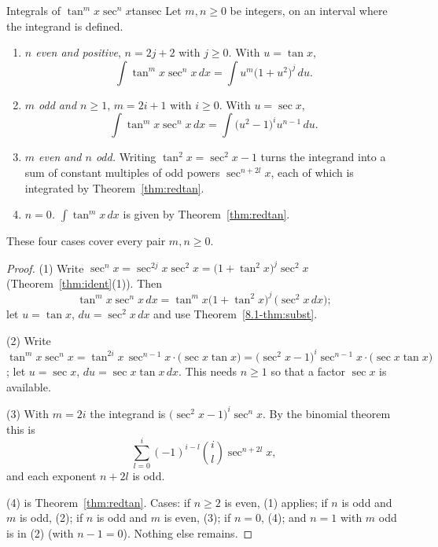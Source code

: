 \documentclass[11pt]{article}
\begin{document}
\begin{thm}{Integrals of $\tan^mx\sec^nx$}{tansec}
Let $m,n\ge0$ be integers, on an interval where the integrand is defined.
\begin{enumerate}[label=(\arabic*)]
  \item \emph{$n$ even and positive}, $n=2j+2$ with $j\ge0$. With $u=\tan x$,
  \[\int\tan^mx\sec^nx\,dx=\int u^m\big(1+u^2\big)^j\,du .\]
  \item \emph{$m$ odd and $n\ge1$}, $m=2i+1$ with $i\ge0$. With $u=\sec x$,
  \[\int\tan^mx\sec^nx\,dx=\int\big(u^2-1\big)^iu^{n-1}\,du .\]
  \item \emph{$m$ even and $n$ odd.} Writing $\tan^2x=\sec^2x-1$ turns the integrand into a sum of constant multiples of odd powers $\sec^{n+2l}x$, each of which is integrated by Theorem~\ref{thm:redtan}.
  \item \emph{$n=0$.} $\int\tan^mx\,dx$ is given by Theorem~\ref{thm:redtan}.
\end{enumerate}
These four cases cover every pair $m,n\ge0$.
\end{thm}
\begin{proof}
(1) Write $\sec^nx=\sec^{2j}x\sec^2x=\big(1+\tan^2x\big)^j\sec^2x$ (Theorem~\ref{thm:ident}(1)). Then
\[\tan^mx\sec^nx\,dx=\tan^mx\big(1+\tan^2x\big)^j\,\big(\sec^2x\,dx\big);\]
let $u=\tan x$, $du=\sec^2x\,dx$ and use Theorem~\ref{8.1-thm:subst}.

(2) Write $\tan^mx\sec^nx=\tan^{2i}x\,\sec^{n-1}x\cdot\big(\sec x\tan x\big)=\big(\sec^2x-1\big)^i\sec^{n-1}x\cdot\big(\sec x\tan x\big)$; let $u=\sec x$, $du=\sec x\tan x\,dx$. This needs $n\ge1$ so that a factor $\sec x$ is available.

(3) With $m=2i$ the integrand is $\big(\sec^2x-1\big)^i\sec^nx$. By the binomial theorem this is
\[\sum_{l=0}^i(-1)^{i-l}\binom il\sec^{n+2l}x,\]
and each exponent $n+2l$ is odd.

(4) is Theorem~\ref{thm:redtan}. Cases: if $n\ge2$ is even, (1) applies; if $n$ is odd and $m$ is odd, (2); if $n$ is odd and $m$ is even, (3); if $n=0$, (4); and $n=1$ with $m$ odd is in (2) (with $n-1=0$). Nothing else remains.
\end{proof}
\end{document}
